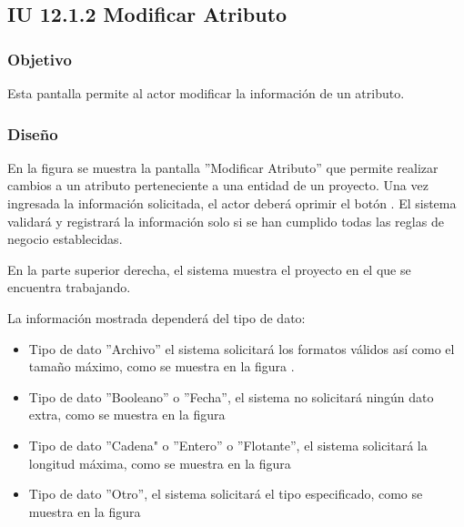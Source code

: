 \subsection{IU 12.1.2 Modificar Atributo}

\subsubsection{Objetivo}
	Esta pantalla permite al actor modificar la información de un atributo.
\subsubsection{Diseño}
	En la figura  se muestra la pantalla ''Modificar Atributo'' que permite realizar cambios a un atributo perteneciente a una entidad de un proyecto.
	Una vez ingresada la información solicitada, el actor deberá oprimir el botón  . El sistema validará y registrará la información solo si se han cumplido todas las reglas de negocio establecidas.
	
	En la parte superior derecha, el sistema muestra el proyecto en el que se encuentra trabajando.
	
	
	La información mostrada dependerá del tipo de dato:
	\begin{itemize}
		\item Tipo de dato ''Archivo'' el sistema solicitará los formatos válidos así como el tamaño máximo, como se muestra en la figura .
		\item Tipo de dato ''Booleano'' o ''Fecha'', el sistema no solicitará ningún dato extra, como se muestra en la figura 
		\item Tipo de dato ''Cadena" o ''Entero'' o ''Flotante'', el sistema solicitará la longitud máxima, como se muestra en la figura 
		\item Tipo de dato ''Otro'', el sistema solicitará el tipo especificado, como se muestra en la figura 
	\end{itemize}

